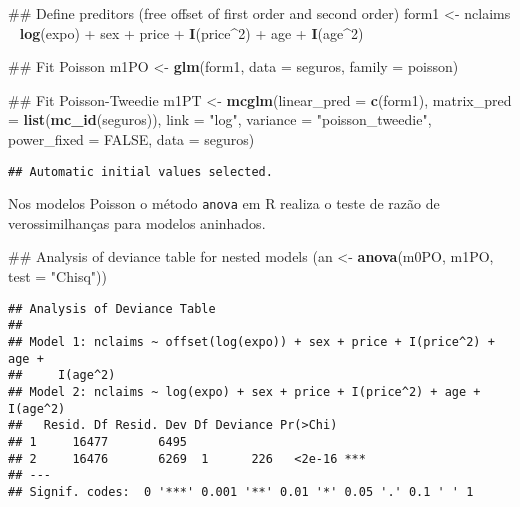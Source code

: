 \documentclass[9pt,a5paper,]{book}
\newenvironment{Shaded}{}{}
\newcommand{\KeywordTok}[1]{\textbf{{#1}}}
\newcommand{\DataTypeTok}[1]{\underline{{#1}}}
\newcommand{\DecValTok}[1]{{#1}}
\newcommand{\StringTok}[1]{{#1}}
\newcommand{\OtherTok}[1]{{#1}}
\newcommand{\NormalTok}[1]{{#1}}
\renewenvironment{Shaded}{\color{inputcolor}}{}
\renewcommand{\DataTypeTok}[1]{{#1}}
\theoremstyle{definition}
\theoremstyle{definition}
\theoremstyle{remark}
\begin{document}
\begin{Shaded}
\begin{Highlighting}[]
\NormalTok{## Define preditors (free offset of first order and second order)}
\NormalTok{form1 <-}\StringTok{ }\NormalTok{nclaims ~}\StringTok{ }\KeywordTok{log}\NormalTok{(expo) +}\StringTok{ }\NormalTok{sex +}
\StringTok{    }\NormalTok{price +}\StringTok{ }\KeywordTok{I}\NormalTok{(price^}\DecValTok{2}\NormalTok{) +}\StringTok{ }\NormalTok{age +}\StringTok{ }\KeywordTok{I}\NormalTok{(age^}\DecValTok{2}\NormalTok{)}

\NormalTok{## Fit Poisson}
\NormalTok{m1PO <-}\StringTok{ }\KeywordTok{glm}\NormalTok{(form1, }\DataTypeTok{data =} \NormalTok{seguros, }\DataTypeTok{family =} \NormalTok{poisson)}

\NormalTok{## Fit Poisson-Tweedie}
\NormalTok{m1PT <-}\StringTok{ }\KeywordTok{mcglm}\NormalTok{(}\DataTypeTok{linear_pred =} \KeywordTok{c}\NormalTok{(form1),}
          \DataTypeTok{matrix_pred =} \KeywordTok{list}\NormalTok{(}\KeywordTok{mc_id}\NormalTok{(seguros)),}
          \DataTypeTok{link =} \StringTok{"log"}\NormalTok{,}
          \DataTypeTok{variance =} \StringTok{"poisson_tweedie"}\NormalTok{,}
          \DataTypeTok{power_fixed =} \OtherTok{FALSE}\NormalTok{,}
          \DataTypeTok{data =} \NormalTok{seguros)}
\end{Highlighting}
\end{Shaded}

\begin{verbatim}
## Automatic initial values selected.
\end{verbatim}

Nos modelos Poisson o método \texttt{anova} em R realiza o teste de
razão de verossimilhanças para modelos aninhados.

\begin{Shaded}
\begin{Highlighting}[]
\NormalTok{## Analysis of deviance table for nested models}
\NormalTok{(an <-}\StringTok{ }\KeywordTok{anova}\NormalTok{(m0PO, m1PO, }\DataTypeTok{test =} \StringTok{"Chisq"}\NormalTok{))}
\end{Highlighting}
\end{Shaded}

\begin{verbatim}
## Analysis of Deviance Table
## 
## Model 1: nclaims ~ offset(log(expo)) + sex + price + I(price^2) + age + 
##     I(age^2)
## Model 2: nclaims ~ log(expo) + sex + price + I(price^2) + age + I(age^2)
##   Resid. Df Resid. Dev Df Deviance Pr(>Chi)    
## 1     16477       6495                         
## 2     16476       6269  1      226   <2e-16 ***
## ---
## Signif. codes:  0 '***' 0.001 '**' 0.01 '*' 0.05 '.' 0.1 ' ' 1
\end{verbatim}
\end{document}
